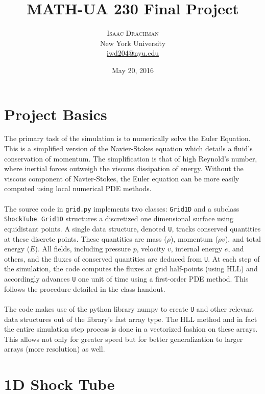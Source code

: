 \documentclass[twoside,twocolumn]{article}
\title{MATH-UA 230 Final Project}
\author{%
\textsc{Isaac Drachman} \\[1ex]
\normalsize New York University \\
\normalsize \href{mailto:iwd204@nyu.edu}{iwd204@nyu.edu}}
\date{May 20, 2016}
\begin{document}
\maketitle


\section{Project Basics}

The primary task of the simulation is to numerically solve the Euler Equation. This is a simplified version of the Navier-Stokes equation which details a fluid's conservation of momentum. The simplification is that of high Reynold's number, where inertial forces outweigh the viscous dissipation of energy. Without the viscous component of Navier-Stokes, the Euler equation can be more easily computed using local numerical PDE methods.\\\\
The source code in \texttt{grid.py} implements two classes: \texttt{Grid1D} and a subclass \texttt{ShockTube}. \texttt{Grid1D} structures a discretized one dimensional surface using
equidistant points. A single data structure, denoted \texttt{U}, tracks conserved quantities
at these discrete points. These quantities are mass ($\rho$), momentum ($\rho v$), and
total energy ($E$). All fields, including pressure $p$, velocity $v$, internal energy $e$, and 
others, and the fluxes of conserved quantities are deduced from \texttt{U}. At each step of the simulation, the code computes the fluxes at grid half-points (using HLL) and accordingly advances \texttt{U} one unit of time using a first-order PDE method. This follows the procedure detailed in the class handout.\\\\ The code makes use of the python library numpy to create \texttt{U} and other relevant
data structures out of the library's fast array type. The HLL method and in fact the entire simulation step process is done in a vectorized fashion on these arrays. This allows not only for greater speed but for better generalization to larger arrays (more resolution) as well.


\section{1D Shock Tube}
\end{document}
